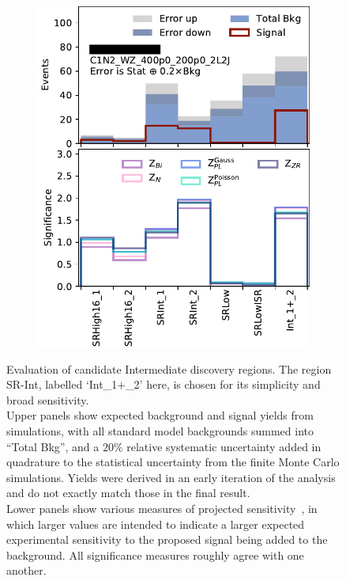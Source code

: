 \begin{figure}[tp]
\begin{subfigure}{0.495\textwidth}
\includegraphics[width=\textwidth]{figures/2ljets_disco_Int_C1N2_WZ_400p0_200p0_2L2J.png}
\caption{}
\end{subfigure}
\caption[
Evaluation of candidate Intermediate discovery regions
]{%
Evaluation of candidate Intermediate discovery regions.
The region SR-Int, labelled `Int\_1$+$\_2' here, is chosen for its simplicity
and broad sensitivity.\\[0.5em]
Upper panels show expected background and signal yields from simulations, with
all standard model backgrounds summed into ``Total Bkg'', and a $20\%$
relative systematic uncertainty added in quadrature to the statistical
uncertainty from the finite Monte Carlo simulations.
Yields were derived in an early iteration of the analysis and do not exactly
match those in the final result.\\[0.5em]
Lower panels show various measures of projected
sensitivity~\cite{cousins2008evaluation}, in which larger values are intended
to indicate a larger expected experimental sensitivity to the proposed signal
being added to the background.
All significance measures roughly agree with one another.
}
\label{fig:2ljets_disco_trials_int}
\end{figure}


